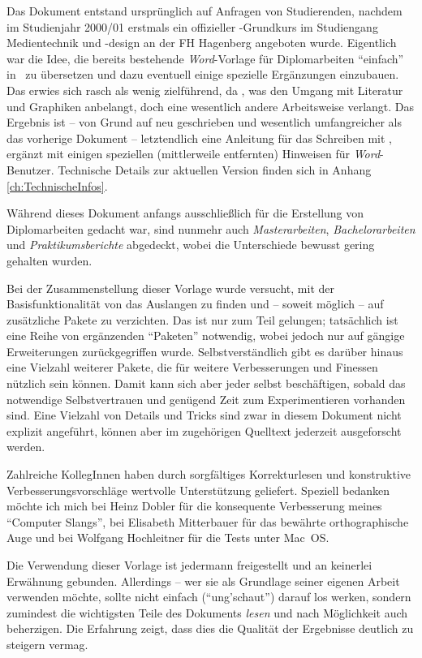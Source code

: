 Das Dokument entstand ursprünglich auf Anfragen von Studierenden,
nachdem im Studienjahr 2000/01 erstmals ein offizieller
\latex-Grundkurs im Studiengang Medientechnik und -design an der
FH Hagenberg angeboten wurde. Eigentlich war die Idee, die bereits
bestehende \emph{Word}-Vorlage für Diplomarbeiten "`einfach"' in
\latex\ zu übersetzen und dazu eventuell einige spezielle
Ergänzungen einzubauen. Das erwies sich rasch als wenig
zielführend, da \latex, \va was den Umgang mit Literatur und
Graphiken anbelangt, doch eine wesentlich andere Arbeitsweise
verlangt. Das Ergebnis ist -- von Grund auf neu geschrieben und
wesentlich umfangreicher als das vorherige Dokument --
letztendlich eine Anleitung für das Schreiben mit \latex, ergänzt
mit einigen speziellen (mittlerweile entfernten) Hinweisen für \emph{Word}-Benutzer.
Technische Details zur aktuellen Version finden sich in Anhang \ref{ch:TechnischeInfos}.

Während dieses Dokument anfangs ausschließlich für die Erstellung
von Diplomarbeiten gedacht war, sind nunmehr auch  
\emph{Masterarbeiten}, \emph{Bachelor\-arbeiten} und \emph{Praktikumsberichte} 
abgedeckt, wobei die Unterschiede bewusst gering gehalten wurden.

Bei der Zusammenstellung dieser Vorlage wurde versucht, mit der
Basisfunktionalität von \latex das Auslangen zu finden und -- soweit möglich --
auf zusätzliche Pakete zu verzichten. Das ist nur zum Teil gelungen;
tat\-säch\-lich ist eine Reihe von ergänzenden "`Paketen"' notwendig, wobei jedoch
nur auf gängige Erweiterungen zurückgegriffen wurde.
Selbstverständlich gibt es darüber hinaus eine Vielzahl weiterer Pakete,
die für weitere Verbesserungen und Finessen nützlich sein können. Damit kann
sich aber jeder selbst beschäftigen, sobald das notwendige Selbstvertrauen und
genügend Zeit zum Experimentieren vorhanden sind.
Eine Vielzahl von Details und Tricks sind zwar in diesem Dokument nicht explizit
angeführt, können aber im zugehörigen Quelltext jederzeit ausgeforscht
werden.

Zahlreiche KollegInnen haben durch sorgfältiges Korrekturlesen und
konstruktive Verbesserungsvorschläge wertvolle Unterstützung
geliefert. Speziell bedanken möchte ich mich bei Heinz Dobler für
die konsequente Verbesserung meines "`Computer Slangs"', bei
Elisabeth Mitterbauer für das bewährte orthographische Auge und
bei Wolfgang Hochleitner für die Tests unter Mac~OS.

Die Verwendung dieser Vorlage ist jedermann freigestellt und an
keinerlei Erwähnung gebunden. Allerdings -- wer sie als Grundlage
seiner eigenen Arbeit verwenden möchte, sollte nicht einfach
("`ung'schaut"') darauf los werken, sondern zumindest die
wichtigsten Teile des Dokuments \emph{lesen} und nach Möglichkeit
auch beherzigen. Die Erfahrung zeigt, dass dies die Qualität der
Ergebnisse deutlich zu steigern vermag.

